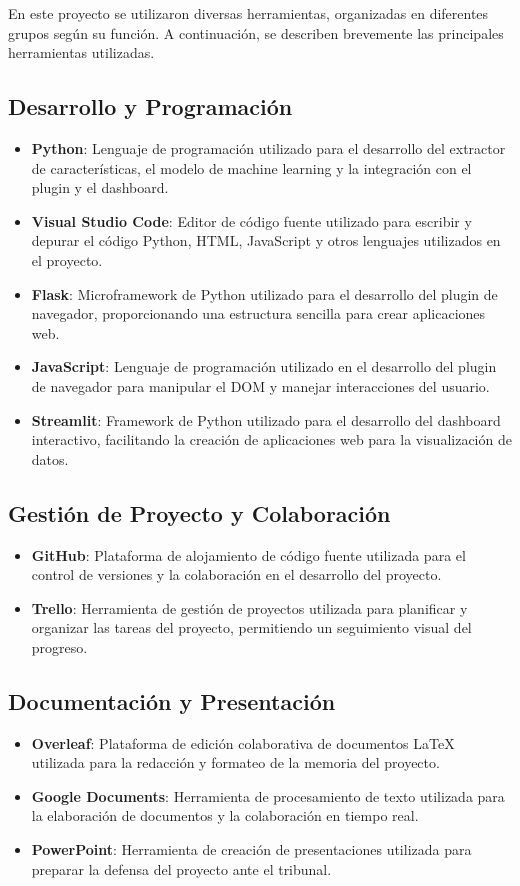 En este proyecto se utilizaron diversas herramientas, organizadas en diferentes grupos según su función. A continuación, se describen brevemente las principales herramientas utilizadas.

\subsection*{Desarrollo y Programación}
\begin{itemize}
    \item \textbf{Python}: Lenguaje de programación utilizado para el desarrollo del extractor de características, el modelo de machine learning y la integración con el plugin y el dashboard.
    \item \textbf{Visual Studio Code}: Editor de código fuente utilizado para escribir y depurar el código Python, HTML, JavaScript y otros lenguajes utilizados en el proyecto.
    \item \textbf{Flask}: Microframework de Python utilizado para el desarrollo del plugin de navegador, proporcionando una estructura sencilla para crear aplicaciones web.
    \item \textbf{JavaScript}: Lenguaje de programación utilizado en el desarrollo del plugin de navegador para manipular el DOM y manejar interacciones del usuario.
    \item \textbf{Streamlit}: Framework de Python utilizado para el desarrollo del dashboard interactivo, facilitando la creación de aplicaciones web para la visualización de datos.
\end{itemize}

\subsection*{Gestión de Proyecto y Colaboración}
\begin{itemize}
    \item \textbf{GitHub}: Plataforma de alojamiento de código fuente utilizada para el control de versiones y la colaboración en el desarrollo del proyecto.
    \item \textbf{Trello}: Herramienta de gestión de proyectos utilizada para planificar y organizar las tareas del proyecto, permitiendo un seguimiento visual del progreso.
\end{itemize}

\subsection*{Documentación y Presentación}
\begin{itemize}
    \item \textbf{Overleaf}: Plataforma de edición colaborativa de documentos LaTeX utilizada para la redacción y formateo de la memoria del proyecto.
    \item \textbf{Google Documents}: Herramienta de procesamiento de texto utilizada para la elaboración de documentos y la colaboración en tiempo real.
    \item \textbf{PowerPoint}: Herramienta de creación de presentaciones utilizada para preparar la defensa del proyecto ante el tribunal.
\end{itemize}

